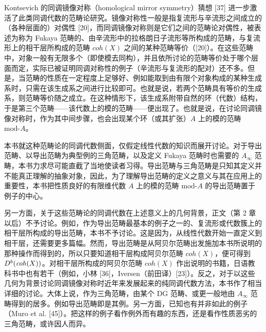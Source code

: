 Kontsevich 的同调镜像对称（homological
mirror symmetry）猜想 [37] 进一步激活了此类同调代数的范畴论研究。镜像对称性一般是指复流形与辛流形之间成立的（各种层面的）对偶性 [20]，而同调镜像对称则是它们之间的范畴论对偶性，被表述为称为 Fukaya 范畴的、由辛流形中的拉格朗日子流形等所构成的范畴，与复流形上的相干层所构成的范畴 $\mathit{coh}(X)$ 之间的某种范畴等价（[20]）。在这些范畴中，对象一般有无限多个（即使模去同构），并且依所讨论的范畴等价处于哪个层面而定，实际已被证明同调对称性的例子（辛流形与复流形的配对）还不多。但是，当范畴的性质在一定程度上足够好、例如能取到由有限个对象构成的某种生成系时，只需在该生成系之间进行比较即可。也就是说，若两个范畴具有等价的生成系，则范畴等价随之成立。在这种情形下，该生成系附带自然的环（代数）结构，于是第三个范畴——该代数上的模的范畴——便出现了。也就是说，在讨论同调镜像对称时，作为其中间步骤，也会出现某个环（或其扩张）$A$ 上的模的范畴 $\mathrm{mod}\text{-}A$。



本书就这种范畴论的同调代数侧面，仅假定线性代数的知识而展开讨论。对于导出范畴、以导出范畴为典型例的三角范畴，以及定义 Fukaya 范畴时也需要的 $A_\infty$ 范畴，本书力求尽可能直截了当地使读者习得。导出范畴与三角范畴是只知其定义并不能真正理解的抽象对象，因此，为了理解导出范畴的定义之意义与其在应用上的重要性，本书把性质良好的有限维代数 $A$ 上的模的范畴 $\mathrm{mod}\text{-}A$ 的导出范畴置于例子的中心。

另一方面，关于这些范畴论的同调代数在上述意义上的几何背景，正文（第 2 章以后）不予讨论。例如，作为导出范畴最基本的例子之一的、复流形或代数簇上的相干层所构成的导出范畴，本书不予讨论。这是因为，从线性代数开始一直定义到相干层，还需要更多篇幅。然而，导出范畴是从阿贝尔范畴出发施加本书所说明的那种操作而得到的，所以只要知道相干层构成阿贝尔范畴 $\mathit{coh}(X)$，便可得到 $D^{b}(\mathit{coh}(X))$。对相干层所构成的阿贝尔范畴 $\mathit{coh}(X)$ 作出说明的书籍，日语教科书中也有若干（例如，小林 [36]，Iversen（前田译）[23]）。反之，对于以这些几何为背景讨论同调镜像对称时近年来发展起来的纯同调代数方法，本书作了相当详细的讨论。大体上说，作为三角范畴，由某个 DG 范畴、或更一般地由 $A_\infty$ 范畴得到的居多。例如导出范畴即是其例。另一方面，已知也有并非如此的例子（Muro et al. [45]）。把这样的例子看作例外而有趣的东西，还是看作性质恶劣的三角范畴，或许因人而异。

